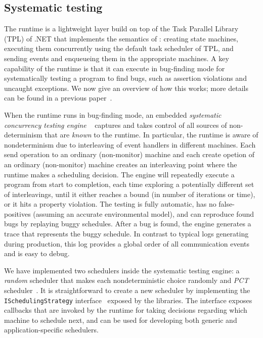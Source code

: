 \subsection{Systematic testing}
\label{sec:psharp:testing}

The \psharp runtime is a lightweight layer build on top of the Task Parallel Library (TPL) of .NET that implements the semantics of \psharp: creating state machines, executing them concurrently using the default task scheduler of TPL, and sending events and enqueueing them in the appropriate machines. A key capability of the \psharp runtime is that it can execute in bug-finding mode for systematically testing a \psharp program to find bugs, such as assertion violations and uncaught exceptions. We now give an overview of how this works; more details can be found in a previous paper~\cite{deligiannis2015psharp}.

When the \psharp runtime runs in bug-finding mode, an embedded \emph{systematic concurrency testing engine}
~\cite{godefroid1997verisoft, musuvathi2008finding, emmi2011delay} captures and takes control of all sources
of non-determinism that are \emph{known} to the \psharp runtime.
In particular, the runtime is aware of nondeterminism due to interleaving of event handlers in different machines.
Each send operation to an ordinary (non-monitor) machine and each create opetion of an ordinary (non-monitor) machine creates an
interleaving point where the runtime makes a scheduling decision.
The engine will repeatedly execute a program from start to completion, each time exploring a potentially different set of interleavings,
until it either reaches a bound (in number of iterations or time), or it hits a property violation.
The testing is fully automatic, has no false-positives (assuming an accurate environmental model),
and can reproduce found bugs by replaying buggy schedules.
After a bug is found, the engine generates a trace that represents the buggy schedule.
In contrast to typical logs generating during production, this log provides a global order of all communication events
and is easy to debug.

We have implemented two schedulers inside the \psharp systematic testing engine:
a \emph{random} scheduler that makes each nondeterministic choice randomly
and \emph{PCT} scheduler~\cite{burckhardt2010pct}.
It is straightforward to create a new scheduler by implementing the \texttt{ISchedulingStrategy} interface~\cite{DesaiQS15}
exposed by the \psharp libraries.
The interface exposes callbacks that are invoked by the \psharp runtime for taking decisions regarding which machine to schedule next,
and can be used for developing both generic and application-specific schedulers.

